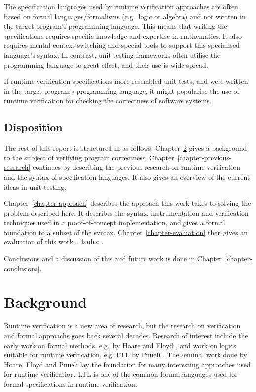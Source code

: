 \documentclass[a4paper,11pt]{kth-mag}
\newcommand{\todo}[1]{\textbf{todo: #1}}
\begin{document}
The specification languages used by runtime verification approaches are often
based on formal languages/formalisms (e.g.\ logic or algebra) and not written in
the target program's programming language.  This means that writing the
specifications requires specific knowledge and expertise in mathematics.  It
also requires mental context-switching and special tools to support this
specialised language's syntax. In contrast, unit testing frameworks often
utilise the programming language to great effect, and their use is wide spread.

If runtime verification specifications more resembled unit tests, and were
written in the target program's programming language, it might popularise the
use of runtime verification for checking the correctness of software systems.

\section{Disposition}

The rest of this report is structured in as follows.
Chapter~\ref{chapter-background} gives a
background to the subject of verifying program correctness.
Chapter~\ref{chapter-previous-research} continues
by describing the previous research on runtime verification and the syntax of
specification languages. It also gives an overview of the current ideas in unit
testing.

Chapter~\ref{chapter-approach} describes the approach this work takes to
solving the problem described here. It describes the syntax, instrumentation
and verification techniques used in a proof-of-concept implementation, and
gives a formal foundation to a subset of the syntax.
Chapter~\ref{chapter-evaluation} then gives an evaluation of this work...
\todo{}.

Conclusions and a discussion of this and future work is done in
Chapter~\ref{chapter-conclusions}.






\pagestyle{newchap}
\chapter{Background} \label{chapter-background}

Runtime verification is a new area of research, but the research on
verification and formal approachs goes back several decades. Research of interest
include the early work on formal methods, e.g.\ by Hoare \cite{hoare69} and
Floyd \cite{floyd67}, and work on logics suitable for runtime verification,
e.g. LTL by Pnueli \cite{pnueli77}. The seminal work done by Hoare, Floyd and
Pnueli lay the foundation for many interesting approaches used for runtime
verification. LTL is one of the common formal languages used for formal
specifications in runtime verification.
\end{document}
